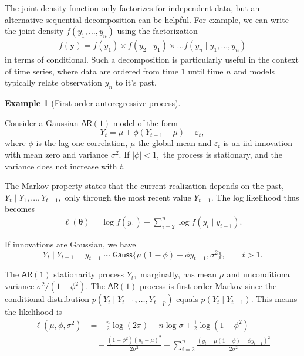 \documentclass[
  11pt,
  letterpaper,
]{scrbook}
\theoremstyle{definition}
\theoremstyle{plain}
\theoremstyle{plain}
\theoremstyle{definition}
\theoremstyle{definition}
\newtheorem{example}{Example}[chapter]
\theoremstyle{remark}
\begin{document}
The joint density function only factorizes for independent data, but an
alternative sequential decomposition can be helpful. For example, we can
write the joint density \(f(y_1, \ldots, y_n)\) using the factorization
\begin{align*}
f(\boldsymbol{y}) = f(y_1) \times f(y_2 \mid y_1) \times \ldots f(y_n \mid y_1, \ldots, y_n)
\end{align*} in terms of conditional. Such a decomposition is
particularly useful in the context of time series, where data are
ordered from time \(1\) until time \(n\) and models typically relate
observation \(y_n\) to it's past.

\begin{example}[First-order autoregressive
process]\protect\hypertarget{exm-autoregressive-one}{}\label{exm-autoregressive-one}

Consider a Gaussian \(\mathsf{AR}(1)\) model of the form
\[Y_t = \mu + \phi(Y_{t-1} - \mu) + \varepsilon_t,\] where \(\phi\) is
the lag-one correlation, \(\mu\) the global mean and \(\varepsilon_t\)
is an iid innovation with mean zero and variance \(\sigma^2.\) If
\(|\phi| < 1,\) the process is stationary, and the variance does not
increase with \(t.\)

The Markov property states that the current realization depends on the
past, \(Y_t \mid Y_1, \ldots, Y_{t-1},\) only through the most recent
value \(Y_{t-1}.\) The log likelihood thus becomes \begin{align*}
\ell(\boldsymbol{\theta}) = \log f(y_1) + \sum_{i=2}^n \log f(y_i \mid y_{i-1}).
\end{align*}

If innovations are Gaussian, we have
\[Y_t \mid Y_{t-1}=y_{t-1} \sim \mathsf{Gauss}\{\mu(1-\phi)+ \phi y_{t-1}, \sigma^2\}, \qquad t>1.\]

The \(\mathsf{AR}(1)\) stationarity process \(Y_t,\) marginally, has
mean \(\mu\) and unconditional variance \(\sigma^2/(1-\phi^2).\) The
\(\mathsf{AR}(1)\) process is first-order Markov since the conditional
distribution \(p(Y_t \mid Y_{t-1}, \ldots, Y_{t-p})\) equals
\(p(Y_t \mid Y_{t-1}).\) This means the likelihood is \begin{align*}
\ell(\mu, \phi,\sigma^2)& = -\frac{n}{2}\log(2\pi) - n\log \sigma + \frac{1}{2}\log(1-\phi^2) \\&\quad -\frac{(1-\phi^2)(y_1- \mu)^2}{2\sigma^2} - \sum_{i=2}^n \frac{(y_t - \mu(1-\phi)- \phi y_{t-1})^2}{2\sigma^2}
\end{align*}

\end{example}
\end{document}
